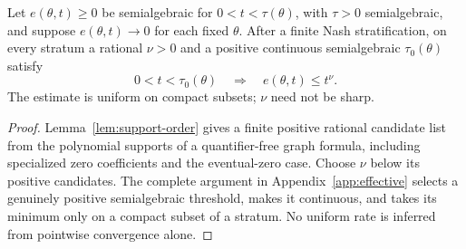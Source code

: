 \begin{proposition}\label{prop:decay}
Let $e(\theta,t)\ge0$ be semialgebraic for $0<t<\tau(\theta)$, with
$\tau>0$ semialgebraic, and suppose $e(\theta,t)\to0$ for each fixed
$\theta$. After a finite Nash stratification, on every stratum a rational
$\nu>0$ and a positive continuous semialgebraic $\tau_0(\theta)$ satisfy
\[
 0<t<\tau_0(\theta)\quad\Longrightarrow\quad e(\theta,t)\le t^\nu.
\]
The estimate is uniform on compact subsets; $\nu$ need not be sharp.
\end{proposition}
\begin{proof}
Lemma~\ref{lem:support-order} gives a finite positive rational candidate
list from the polynomial supports of a quantifier-free graph formula,
including specialized zero coefficients and the eventual-zero case.
Choose $\nu$ below its positive candidates. The complete argument in
Appendix~\ref{app:effective} selects a genuinely positive semialgebraic
threshold, makes it continuous, and takes its minimum only on a compact
subset of a stratum. No uniform rate is inferred from pointwise
convergence alone.
\end{proof}

